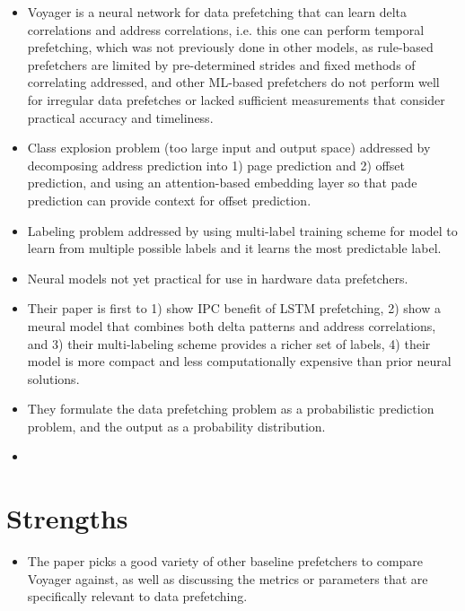 \documentclass [12pt]{article}
\begin{document}
        
        \begin{itemize}
            \item Voyager is a neural network for data prefetching that can learn delta correlations and address correlations, i.e. this one can perform temporal prefetching, which was not previously done in other models, as rule-based prefetchers are limited by pre-determined strides and fixed methods of correlating addressed, and other ML-based prefetchers do not perform well for irregular data prefetches or lacked sufficient measurements that consider practical accuracy and timeliness.
            \item Class explosion problem (too large input and output space) addressed by decomposing address prediction into 1) page prediction and 2) offset prediction, and using an attention-based embedding layer so that pade prediction can provide context for offset prediction.
            \item Labeling problem addressed by using multi-label training scheme for model to learn from multiple possible labels and it learns the most predictable label.
            \item Neural models not yet practical for use in hardware data prefetchers.
            \item Their paper is first to 1) show IPC benefit of LSTM prefetching, 2) show a meural model that combines both delta patterns and address correlations, and 3) their multi-labeling scheme provides a richer set of labels, 4) their model is more compact and less computationally expensive than prior neural solutions. 
            \item They formulate the data prefetching problem as a probabilistic prediction problem, and the output as a probability distribution. 
            \item 
        \end{itemize}


    \section{Strengths} %
    \label{sec:strengths}
        \begin{itemize}
            \item The paper picks a good variety of other baseline prefetchers to compare Voyager against, as well as discussing the metrics or parameters that are specifically relevant to data prefetching. 
        \end{itemize}
\end{document}
